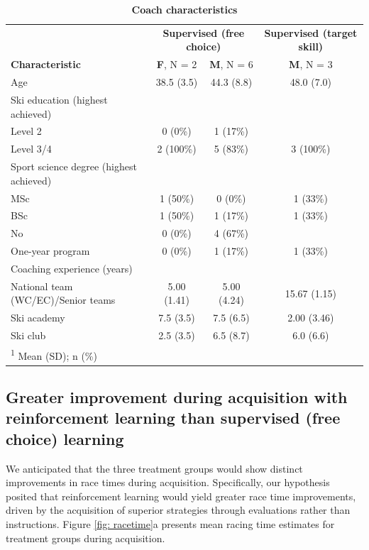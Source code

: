 \documentclass[pdflatex,sn-mathphys-num]{sn-jnl}%
\theoremstyle{thmstyleone}%
\theoremstyle{thmstyletwo}%
\theoremstyle{thmstylethree}%
\begin{document}
\begin{table}\label{descriptive_coach}
\caption{\textbf{Coach characteristics}}
\centering
\begin{tabular}[H]{l|c|c|c}
\hline
\multicolumn{1}{c|}{ } & \multicolumn{2}{c|}{\textbf{Supervised (free choice)}} & \multicolumn{1}{c}{\textbf{Supervised (target skill)}} \\
\textbf{Characteristic} & \textbf{F}, N = 2 & \textbf{M}, N = 6 & \textbf{M}, N = 3\\
\hline
Age & 38.5 (3.5) & 44.3 (8.8) & 48.0 (7.0)\\
\hline
Ski education (highest achieved) &  &  & \\
\hline
\hspace{1em}Level 2 & 0 (0\%) & 1 (17\%) & \\
\hline
\hspace{1em}Level 3/4 & 2 (100\%) & 5 (83\%) & 3 (100\%)\\
\hline
Sport science degree (highest achieved) &  &  & \\
\hline
\hspace{1em}MSc & 1 (50\%) & 0 (0\%) & 1 (33\%)\\
\hline
\hspace{1em}BSc & 1 (50\%) & 1 (17\%) & 1 (33\%)\\
\hline
\hspace{1em}No & 0 (0\%) & 4 (67\%) & \\
\hline
\hspace{1em}One-year program & 0 (0\%) & 1 (17\%) & 1 (33\%)\\
\hline
Coaching experience (years) &  &  & \\
\hline
\hspace{1em}National team (WC/EC)/Senior teams & 5.00 (1.41) & 5.00 (4.24) & 15.67 (1.15)\\
\hline
\hspace{1em}Ski academy & 7.5 (3.5) & 7.5 (6.5) & 2.00 (3.46)\\
\hline
\hspace{1em}Ski club & 2.5 (3.5) & 6.5 (8.7) & 6.0 (6.6)\\
\hline
\multicolumn{4}{l}{\rule{0pt}{1em}\textsuperscript{1} Mean (SD); n (\%)}\\
\end{tabular}
\end{table} 

\subsection{Greater improvement during acquisition with reinforcement learning than supervised (free choice) learning}\label{result_racetime_acquisition}
We anticipated that the three treatment groups would show distinct improvements in race times during acquisition. Specifically, our hypothesis posited that reinforcement learning would yield greater race time improvements, driven by the acquisition of superior strategies through evaluations rather than instructions. Figure \ref{fig: racetime}a presents mean racing time estimates for treatment groups during acquisition.
\end{document}
